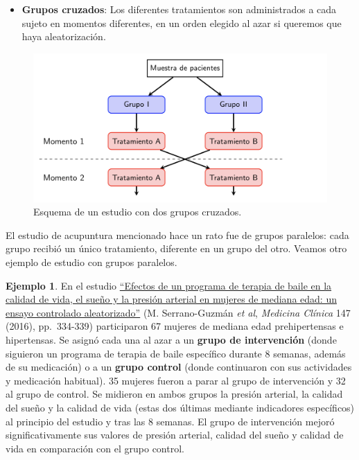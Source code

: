 \documentclass[
]{book}
\providecommand{\tightlist}{%
  \setlength{\itemsep}{0pt}\setlength{\parskip}{0pt}}
\theoremstyle{definition}
\theoremstyle{definition}
\newtheorem{example}{Ejemplo}[chapter]
\theoremstyle{definition}
\theoremstyle{definition}
\theoremstyle{remark}
\begin{document}
\begin{itemize}
\tightlist
\item
  \textbf{Grupos cruzados}: Los diferentes tratamientos son administrados a cada sujeto en momentos diferentes, en un orden elegido al azar si queremos que haya aleatorización.
\end{itemize}

\begin{figure}

{\centering \includegraphics[width=0.8\linewidth]{INREMDN_files/figure-html/EsquemaGC} 

}

\caption{Esquema de un estudio con dos grupos cruzados.}\label{fig:cruzados}
\end{figure}

El estudio de acupuntura mencionado hace un rato fue de grupos paralelos: cada grupo recibió un único tratamiento, diferente en un grupo del otro. Veamos otro ejemplo de estudio con grupos paralelos.

\begin{example}
\protect\hypertarget{exm:baile}{}\label{exm:baile}En el estudio \href{https://www.sciencedirect.com/science/article/pii/S0025775316303116}{``Efectos de un programa de terapia de baile en la calidad de vida, el sueño y la presión arterial en mujeres de mediana edad: un ensayo controlado aleatorizado''} (M. Serrano-Guzmán \emph{et al}, \emph{Medicina Clínica} 147 (2016), pp.~334-339) participaron 67 mujeres de mediana edad prehipertensas e hipertensas. Se asignó cada una al azar a un \textbf{grupo de intervención} (donde siguieron un programa de terapia de baile específico durante 8 semanas, además de su medicación) o a un \textbf{grupo control} (donde continuaron con sus actividades y medicación habitual). 35 mujeres fueron a parar al grupo de intervención y 32 al grupo de control. Se midieron en ambos grupos la presión arterial, la calidad del sueño y la calidad de vida (estas dos últimas mediante indicadores específicos) al principio del estudio y tras las 8 semanas. El grupo de intervención mejoró significativamente sus valores de presión arterial, calidad del sueño y calidad de vida en comparación con el grupo control.
\end{example}
\end{document}
